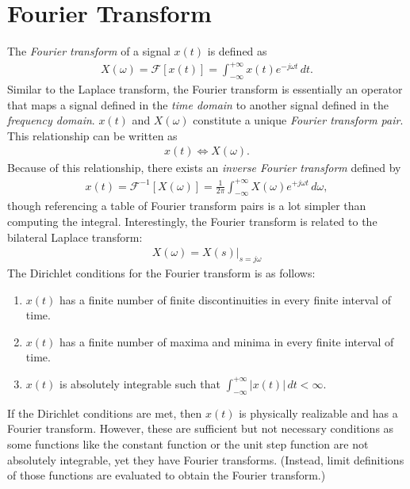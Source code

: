 \documentclass{report}
\begin{document}
\section{Fourier Transform}
The \emph{Fourier transform} of a signal $x(t)$ is defined as 
\begin{align}
    X(\omega) = \mathcal{F}[x(t)] = \int_{-\infty}^{+\infty} x(t) e^{-j\omega t} \,dt.
\end{align}
Similar to the Laplace transform, the Fourier transform is essentially an operator that maps a signal defined in the \emph{time domain} to another signal defined 
in the \emph{frequency domain}. $x(t)$ and $X(\omega)$ constitute a unique \emph{Fourier transform pair}. This relationship can be written as 
\begin{align}
    x(t) \iff X(\omega).
\end{align}
Because of this relationship, there exists an \emph{inverse Fourier transform} defined by
\begin{align}
    x(t) = \mathcal{F}^{-1}[X(\omega)] = \frac{1}{2\pi}\int_{-\infty}^{+\infty} X(\omega) e^{+j\omega t} \,d\omega,
\end{align}
though referencing a table of Fourier transform pairs is a lot simpler than computing the integral. 
Interestingly, the Fourier transform is related to the bilateral Laplace transform:
\begin{align}
    X(\omega) = X(s)\big|_{s=j\omega}
\end{align}
The Dirichlet conditions for the Fourier transform is as follows:
\begin{enumerate}
    \item $x(t)$ has a finite number of finite discontinuities in every finite interval of time.
    \item $x(t)$ has a finite number of maxima and minima in every finite interval of time.
    \item $x(t)$ is absolutely integrable such that $\displaystyle\int_{-\infty}^{+\infty}|x(t)| \,dt < \infty$.
\end{enumerate}
If the Dirichlet conditions are met, then $x(t)$ is physically realizable and has a Fourier transform. However, these are sufficient but not necessary conditions 
as some functions like the constant function or the unit step function are not absolutely integrable, yet they have Fourier transforms. 
(Instead, limit definitions of those functions are evaluated to obtain the Fourier transform.)
\\ \\
\end{document}
